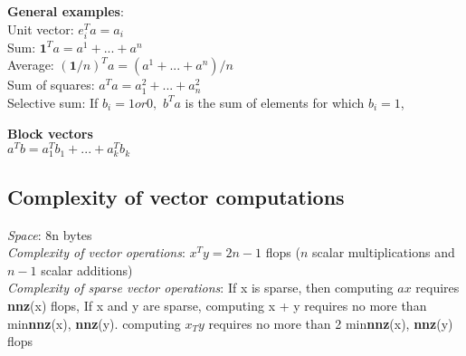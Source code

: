 \textbf{General examples}:\\
\textbullet Unit vector: $e_i^T a = a_i$ \\
\textbullet Sum: $\textbf{1}^T a = a^1 + ... + a^n$ \\
\textbullet Average: $(\textbf{1}/n)^T a=(a^1+...+a^n)/n$\\ 
\textbullet Sum of squares: $a^Ta = a^2_1 +...+a^2_n$\\
\textbullet Selective sum: If $b_i = 1 or 0,$ \textit{$b^Ta$} is the sum of elements for which $b_i = 1$,

\textbf{Block vectors}\\
$a^T b = a_1^T b_1 + ... + a_k^T b_k$

\subsection{Complexity of vector computations}
\textit{Space}:  8n bytes\\
\textit{Complexity of vector operations}: $x^Ty=2n-1$ flops ($n$ scalar multiplications and $n-1$ scalar additions)\\
\textit{Complexity of sparse vector operations}: If x is sparse, then computing $ax$ requires \textbf{nnz}(x) flops, If x and y are sparse, computing x + y requires no more than min{\textbf{nnz}(x), \textbf{nnz}(y)}. computing $x_T y$ requires no more than 2 min{\textbf{nnz}(x), \textbf{nnz}(y)} flops
